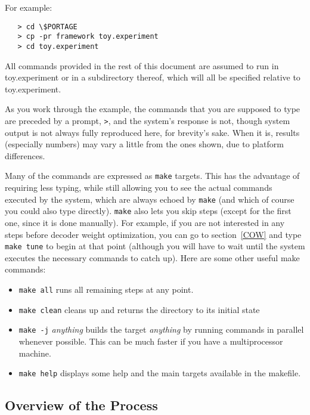 \documentclass[11pt]{article}
\begin{document}
For example:
\begin{verbatim}
   > cd \$PORTAGE
   > cp -pr framework toy.experiment
   > cd toy.experiment
\end{verbatim}
All commands provided in the rest of this document are assumed to run in
toy.experiment or in a subdirectory thereof, which will all be specified
relative to toy.experiment.

As you work through the example, the commands that you are supposed to type are
preceded by a prompt, \texttt{>}, and the system's response is not, though
system output is not always fully reproduced here, for brevity's sake.  When it
is, results (especially numbers) may vary a little from the ones shown, due to
platform differences.

Many of the commands are expressed as {\tt make} targets. This has the
advantage of requiring less typing, while still allowing you to see the actual
commands executed by the system, which are always echoed by {\tt make} (and
which of course you could also type directly). {\tt make} also lets you skip
steps (except for the first one, since it is done manually).  For example, if
you are not interested in any steps before decoder weight optimization, you can
go to section~\ref{COW} and type {\tt make tune} to begin at that point
(although you will have to wait until the system executes the necessary
commands to catch up). Here are some other useful make commands:
\begin{itemize}
\item {\tt make all} runs all remaining steps at any point.
\item {\tt make clean} cleans up and returns the directory to its initial state
\item {\tt make -j} {\em anything} builds the target {\em anything} by running
      commands in parallel whenever possible. This can be much faster if you
      have a multiprocessor machine.
\item {\tt make help} displays some help and the main targets available in the
      makefile.
\end{itemize}

\subsection{Overview of the Process}
\end{document}
